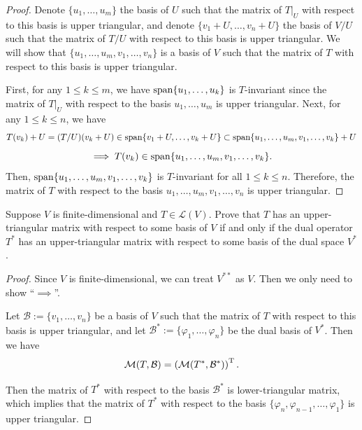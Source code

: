 \documentclass{article}
\begin{document}
\begin{proof}
  Denote \( \{u_1,\dots,u_m\} \) the basis of \( U \) such that the matrix of \( T|_U \) with respect to this basis is upper triangular, and denote \( \{v_1+U,\dots,v_n+U\} \) the basis of \( V/U \) such that the matrix of \( T/U \) with respect to this basis is upper triangular. We will show that \( \{u_1,\dots,u_m,v_1,\dots,v_n\} \) is a basis of \( V \) such that the matrix of \( T \) with respect to this basis is upper triangular.\par
  First, for any \( 1\le k\le m \), we have \( \operatorname{span}\{u_1,\dots,u_k\} \) is \( T \)-invariant since the matrix of \( T|_U \) with respect to the basis \( u_1,\dots,u_m \) is upper triangular. Next, for any \( 1\le k\le n \), we have
  \[ T(v_k)+U=(T/U)(v_k+U)\in \operatorname{span}\{v_1+U,\dots,v_k+U\} \subset \operatorname{span}\{u_1,\dots,u_m,v_1,\dots,v_k\}+U \]
  \[ \implies T(v_k)\in \operatorname{span}\{u_1,\dots,u_m,v_1,\dots,v_k\}. \]
  Then, \( \operatorname{span}\{u_1,\dots,u_m,v_1,\dots,v_k\} \) is \( T \)-invariant for all \( 1\le k\le n \). Therefore, the matrix of \( T \) with respect to the basis \( u_1,\dots,u_m,v_1,\dots,v_n \) is upper triangular.
\end{proof}



\begin{problem}[5C-14]
Suppose $V$ is finite-dimensional and $T \in \mathcal{L}(V)$. Prove that $T$ has an upper-triangular matrix with respect to some basis of $V$ if and only if the dual operator $T^*$ has an upper-triangular matrix with respect to some basis of the dual space $V^*$.
\end{problem}

\begin{proof}
  Since \( V \) is finite-dimensional, we can treat \( V^{**} \) as \( V \). Then we only need to show ``\( \implies \)''. \par
  Let \( \mathcal{B}:=\{ v_1,\dots,v_n \} \) be a basis of \( V \) such that the matrix of \( T \) with respect to this basis is upper triangular, and let \( \mathcal{B}^*:=\{ \varphi_1,\dots,\varphi_n \} \) be the dual basis of \( V^* \). Then we have
  \[ \mathcal{M}(T,\mathcal{B})=\left( \mathcal{M}(T^*,\mathcal{B}^*) \right)^\mathrm{T}. \]\par
  Then the matrix of \( T^* \) with respect to the basis \( \mathcal{B}^* \) is lower-triangular matrix, which implies that the matrix of \( T^* \) with respect to the basis \( \{\varphi_n,\varphi_{n-1},\dots,\varphi_1\} \) is upper triangular.
\end{proof}
\end{document}
